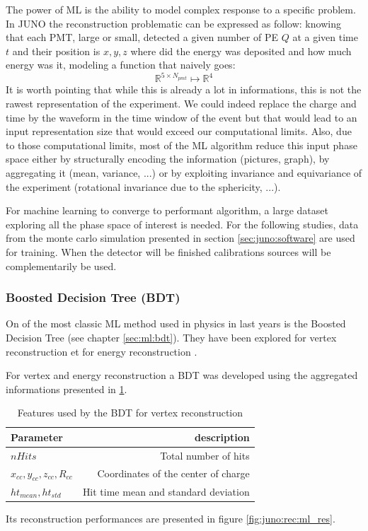 The power of ML is the ability to model complex response to a specific problem. In JUNO the reconstruction problematic can be expressed as follow: knowing that each PMT, large or small, detected a given number of PE $Q$ at a given time $t$ and their position is $x,y,z$ where did the energy was deposited and how much energy was it, modeling a function that naively goes:
\begin{equation}
    \mathbb{R}^{5 \times N_{pmt}} \longmapsto \mathbb{R}^4
\end{equation}
It is worth pointing that while this is already a lot in informations, this is not the rawest representation of the experiment. We could indeed replace the charge and time by the waveform in the time window of the event but that would lead to an input representation size that would exceed our computational limits. Also, due to those computational limits, most of the ML algorithm reduce this input phase space either by structurally encoding the information (pictures, graph), by aggregating it (mean, variance, ...) or by exploiting invariance and equivariance of the experiment (rotational invariance due to the sphericity, ...).

For machine learning to converge to performant algorithm, a large dataset exploring all the phase space of interest is needed. For the following studies, data from the monte carlo simulation presented in section \ref{sec:juno:software} are used for training. When the detector will be finished calibrations sources will be complementarily be used.

\subsubsection{Boosted Decision Tree (BDT)}

On of the most classic ML method used in physics in last years is the Boosted Decision Tree (see chapter \ref{sec:ml:bdt}). They have been explored for vertex reconstruction \cite{qian_vertex_2021} et for energy reconstruction \cite{qian_vertex_2021, gavrikov_energy_2022}.

For vertex and energy reconstruction a BDT was developed using the aggregated informations presented in \ref{tab:juno:rec:bdt_vertex}.

\begin{table}[ht]
  \centering
  \begin{tabular}{l|r}
    Parameter & description \\
    \hline
    $nHits$ & Total number of hits \\
    $x_{cc}, y_{cc}, z_{cc}, R_{cc}$ & Coordinates of the center of charge \\
    $ht_{mean}, ht_{std}$ & Hit time mean and standard deviation
  \end{tabular}
  \caption{Features used by the BDT for vertex reconstruction}
  \label{tab:juno:rec:bdt_vertex}
\end{table}
Its reconstruction performances are presented in figure \ref{fig:juno:rec:ml_res}.

